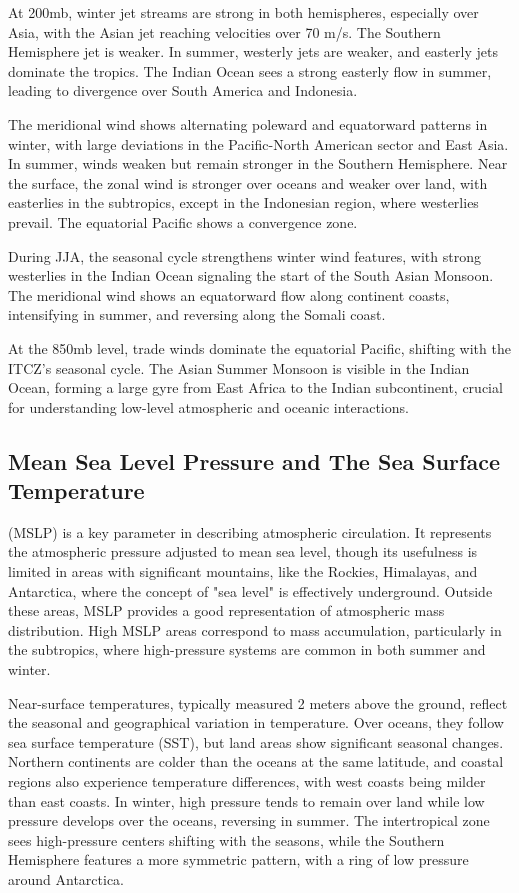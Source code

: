 At 200mb, winter jet streams are strong in both hemispheres, especially over Asia, with the Asian jet reaching velocities over 70 m/s. The Southern Hemisphere jet is weaker. In summer, westerly jets are weaker, and easterly jets dominate the tropics. The Indian Ocean sees a strong easterly flow in summer, leading to divergence over South America and Indonesia.

The meridional wind shows alternating poleward and equatorward patterns in winter, with large deviations in the Pacific-North American sector and East Asia. In summer, winds weaken but remain stronger in the Southern Hemisphere. Near the surface, the zonal wind is stronger over oceans and weaker over land, with easterlies in the subtropics, except in the Indonesian region, where westerlies prevail. The equatorial Pacific shows a convergence zone.

During JJA, the seasonal cycle strengthens winter wind features, with strong westerlies in the Indian Ocean signaling the start of the South Asian Monsoon. The meridional wind shows an equatorward flow along continent coasts, intensifying in summer, and reversing along the Somali coast.

At the 850mb level, trade winds dominate the equatorial Pacific, shifting with the ITCZ’s seasonal cycle. The Asian Summer Monsoon is visible in the Indian Ocean, forming a large gyre from East Africa to the Indian subcontinent, crucial for understanding low-level atmospheric and oceanic interactions.

\subsection{Mean Sea Level Pressure and The Sea Surface Temperature}
 (MSLP) is a key parameter in describing atmospheric circulation. It represents the atmospheric pressure adjusted to mean sea level, though its usefulness is limited in areas with significant mountains, like the Rockies, Himalayas, and Antarctica, where the concept of "sea level" is effectively underground. Outside these areas, MSLP provides a good representation of atmospheric mass distribution. High MSLP areas correspond to mass accumulation, particularly in the subtropics, where high-pressure systems are common in both summer and winter.

Near-surface temperatures, typically measured 2 meters above the ground, reflect the seasonal and geographical variation in temperature. Over oceans, they follow sea surface temperature (SST), but land areas show significant seasonal changes. Northern continents are colder than the oceans at the same latitude, and coastal regions also experience temperature differences, with west coasts being milder than east coasts. In winter, high pressure tends to remain over land while low pressure develops over the oceans, reversing in summer. The intertropical zone sees high-pressure centers shifting with the seasons, while the Southern Hemisphere features a more symmetric pattern, with a ring of low pressure around Antarctica.

